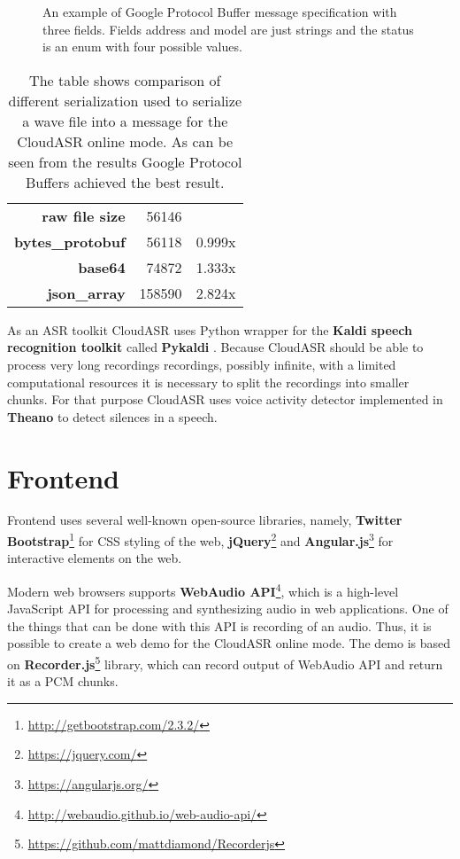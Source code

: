 \begin{figure}[h]
  

  \caption{
    An example of Google Protocol Buffer message specification with three fields.
    Fields address and model are just strings and the status is an enum with four possible values.
  }
  \label{fig:protobuf}
\end{figure}

\begin{table}
  \begin{tabular}{rrl}
  \textbf{raw file size} & 56146 & \\
  \cline{1-3}
  \textbf{bytes\_protobuf} & 56118 & 0.999x \\
  \textbf{base64} & 74872 & 1.333x \\
  \textbf{json\_array} & 158590 & 2.824x \\
  \end{tabular}

  \caption{
    The table shows comparison of different serialization used to serialize a wave file into a message for the CloudASR online mode.
    As can be seen from the results Google Protocol Buffers achieved the best result.
  }
  \label{fig:protobuf-benchmark}
\end{table}

As an ASR toolkit CloudASR uses Python wrapper for the \textbf{Kaldi speech recognition toolkit} \cite{povey2011kaldi} called \textbf{Pykaldi} \cite{platek2014free}.
Because CloudASR should be able to process very long recordings recordings, possibly infinite,
  with a limited computational resources
  it is necessary to split the recordings into smaller chunks.
For that purpose CloudASR uses voice activity detector implemented in \textbf{Theano} \cite{bergstra2010theano} to detect silences in a speech.


\section{Frontend}
Frontend uses several well-known open-source libraries, namely,
  \textbf{Twitter Bootstrap}\footnote{\url{http://getbootstrap.com/2.3.2/}} for CSS styling of the web,
  \textbf{jQuery}\footnote{\url{https://jquery.com/}}
  and \textbf{Angular.js}\footnote{\url{https://angularjs.org/}} for interactive elements on the web.


Modern web browsers supports \textbf{WebAudio API}\footnote{\url{http://webaudio.github.io/web-audio-api/}},
  which is a high-level JavaScript API for processing and synthesizing audio in web applications.
One of the things that can be done with this API is recording of an audio.
Thus, it is possible to create a web demo for the CloudASR online mode.
The demo is based on \textbf{Recorder.js}\footnote{\url{https://github.com/mattdiamond/Recorderjs}} library,
  which can record output of WebAudio API and return it as a PCM chunks.

